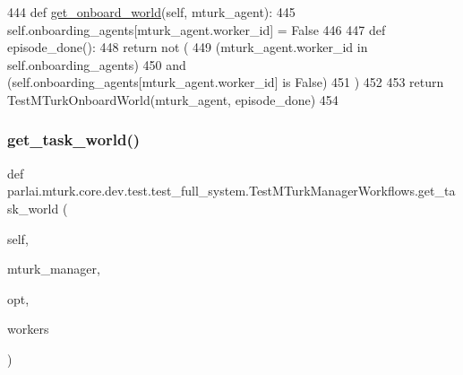 \begin{DoxyCode}
444     \textcolor{keyword}{def }\hyperlink{namespaceparlai_1_1mturk_1_1core_1_1dev_1_1test_1_1test__mturk__manager_aafd69ff9f051e4dd382a610b58f65710}{get\_onboard\_world}(self, mturk\_agent):
445         self.onboarding\_agents[mturk\_agent.worker\_id] = \textcolor{keyword}{False}
446 
447         \textcolor{keyword}{def }episode\_done():
448             \textcolor{keywordflow}{return} \textcolor{keywordflow}{not} (
449                 (mturk\_agent.worker\_id \textcolor{keywordflow}{in} self.onboarding\_agents)
450                 \textcolor{keywordflow}{and} (self.onboarding\_agents[mturk\_agent.worker\_id] \textcolor{keywordflow}{is} \textcolor{keyword}{False})
451             )
452 
453         \textcolor{keywordflow}{return} TestMTurkOnboardWorld(mturk\_agent, episode\_done)
454 
\end{DoxyCode}
\mbox{\label{classparlai_1_1mturk_1_1core_1_1dev_1_1test_1_1test__full__system_1_1TestMTurkManagerWorkflows_a9499834ef926100c17c84ec394a01086}} 
\subsubsection{\texorpdfstring{get\+\_\+task\+\_\+world()}{get\_task\_world()}}
{\footnotesize\ttfamily def parlai.\+mturk.\+core.\+dev.\+test.\+test\+\_\+full\+\_\+system.\+Test\+M\+Turk\+Manager\+Workflows.\+get\+\_\+task\+\_\+world (\begin{DoxyParamCaption}\item[{}]{self,  }\item[{}]{mturk\+\_\+manager,  }\item[{}]{opt,  }\item[{}]{workers }\end{DoxyParamCaption})}



